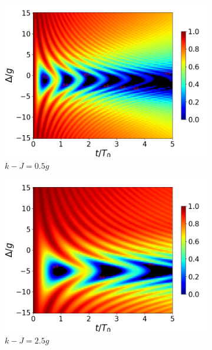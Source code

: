 \begin{figure}[h]
    \vfill
    \begin{subfigure}{0.49\textwidth}
        \includegraphics[width=\textwidth]{figuras/ch4/concu/delta/eg0+ge0 k=0.5g x=0.0g J=0.0g gamma=0.25g concu delta dis.png}
        \caption{$k-J=0.5g$}
        \label{fig4:concu detunning k1}
    \end{subfigure}
    \hfill
    \begin{subfigure}{0.49\textwidth}
        \includegraphics[width=\textwidth]{figuras/ch4/concu/delta/eg0+ge0 k=2.5g x=0.0g J=0.0g gamma=0.25g concu delta dis.png}
        \caption{$k-J=2.5g$}
        \label{fig4:concu detunning k2}
    \end{subfigure}
    \caption{}
    \label{fig4:concu detunning 0 params}
\end{figure}

